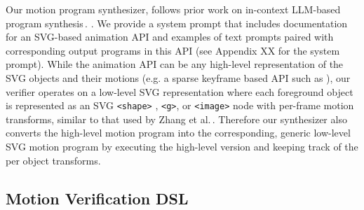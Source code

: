 Our motion program synthesizer, follows prior work on in-context
LLM-based program synthesis\,\cite{}. . We provide a system prompt that
includes documentation for an SVG-based animation API and examples of
text prompts paired with corresponding output programs in this API
(see Appendix XX for the system prompt).
%
While the animation API can be any high-level representation of the
SVG objects and their motions (e.g. a sparse keyframe based API such
as  ), our verifier operates on a low-level SVG representation
where each foreground object is represented as an SVG {\tt <shape>} ,
{\tt <g>}, or {\tt <image>} node with per-frame motion transforms,
similar to that used by Zhang et al.\,\shortcite{}.
%
Therefore our synthesizer also converts the high-level motion program
into the corresponding, generic low-level SVG motion program by
executing the high-level version and keeping track of the per object
transforms.

\subsection{Motion Verification DSL}
\label{sec:dsl}


